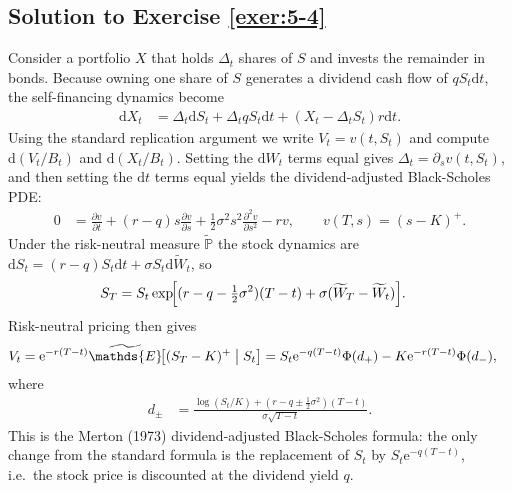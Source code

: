 \documentclass[12pt]{book}
\numberwithin{equation}{chapter}
\theoremstyle{plain}
\numberwithin{theorem}{section}
\theoremstyle{definition}
\numberwithin{exercise}{chapter}
\newcommand{\<}{\langle}
\renewcommand{\>}{\rangle}
\renewcommand{\(}{\left(}
\renewcommand{\)}{\right)}
\renewcommand{\[}{\left[}
\renewcommand{\]}{\right]}
\newcommand\Eb{\mathds{E}}
\newcommand\Pb{\mathds{P}}
\newcommand\sig{\sigma}
\newcommand\Del{\Delta}
\newcommand\Ebt{\widetilde{\Eb}}
\newcommand\Pbt{\widetilde{\Pb}}
\newcommand\Wt{\widetilde{W}}
\renewcommand\d{\partial}
\newcommand\dd{\mathrm{d}}
\newcommand\ee{\mathrm{e}}
\theoremstyle{definition}
\numberwithin{question}{section}
\begin{document}
\subsection*{Solution to Exercise \ref{exer:5-4}}
Consider a portfolio $X$ that holds $\Del_t$ shares of $S$ and invests the remainder in bonds.  Because owning one share of $S$ generates a dividend cash flow of $q S_t \dd t$, the self-financing dynamics become
\begin{align}
\dd X_t
  &= \Del_t \dd S_t + \Del_t q S_t \dd t + (X_t - \Del_t S_t) r \dd t .
\end{align}
Using the standard replication argument we write $V_t = v(t,S_t)$ and compute $\dd(V_t/B_t)$ and $\dd(X_t/B_t)$.  Setting the $\dd W_t$ terms equal gives $\Del_t = \d_s v(t,S_t)$, and then setting the $\dd t$ terms equal yields the dividend-adjusted Black-Scholes PDE:
\begin{align}
0
  &= \frac{\d v}{\d t} + (r-q) s \frac{\d v}{\d s} + \frac{1}{2}\sig^2 s^2 \frac{\d^2 v}{\d s^2} - r v , \qquad v(T,s) = (s-K)^+ .
\end{align}
Under the risk-neutral measure $\Pbt$ the stock dynamics are $\dd S_t = (r-q) S_t \dd t + \sig S_t \dd \Wt_t$, so
\begin{align}
S_T
  &= S_t \exp\!\Bigl[(r - q - \tfrac{1}{2}\sig^2)(T-t) + \sig(\Wt_T - \Wt_t)\Bigr] .
\end{align}
Risk-neutral pricing then gives
\begin{align}
V_t
  &= \ee^{-r(T-t)} \Ebt\!\bigl[(S_T - K)^+\bigm| S_t\bigr]
   = S_t \ee^{-q(T-t)} \Phi(d_+) - K \ee^{-r(T-t)} \Phi(d_-) ,
\end{align}
where
\begin{align}
d_\pm
  &= \frac{\log(S_t/K) + (r - q \pm \tfrac{1}{2}\sig^2)(T-t)}{\sig\sqrt{T-t}} .
\end{align}
This is the Merton (1973) dividend-adjusted Black-Scholes formula: the only change from the standard formula is the replacement of $S_t$ by $S_t \ee^{-q(T-t)}$, i.e.\ the stock price is discounted at the dividend yield $q$.
\end{document}
